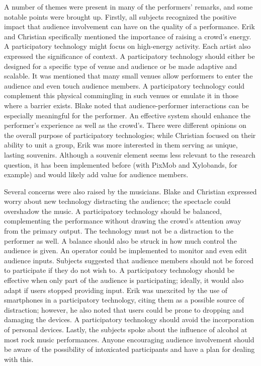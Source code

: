 A number of themes were present in many of the performers' remarks, and some notable points were brought up. Firstly, all subjects recognized the positive impact that audience involvement can have on the quality of a performance. Erik and Christian specifically mentioned the importance of raising a crowd's energy. A participatory technology might focus on high-energy activity. Each artist also expressed the significance of context. A participatory technology should either be designed for a specific type of venue and audience or be made adaptive and scalable. It was mentioned that many small venues allow performers to enter the audience and even touch audience members. A participatory technology could complement this physical commingling in such venues or emulate it in those where a barrier exists. Blake noted that audience-performer interactions can be especially meaningful for the performer. An effective system should enhance the performer's experience as well as the crowd's. There were different opinions on the overall purpose of participatory technologies; while Christian focused on their ability to unit a group, Erik was more interested in them serving as unique, lasting souvenirs.  Although a souvenir element seems less relevant to the research question, it has been implemented before (with PixMob and Xylobands, for example) and would likely add value for audience members. 

Several concerns were also raised by the musicians. Blake and Christian expressed worry about new technology distracting the audience; the spectacle could overshadow the music. A participatory technology should be balanced, complementing the performance without drawing the crowd's attention away from the primary output. The technology must not be a distraction to the performer as well. A balance should also be struck in how much control the audience is given. An operator could be implemented to monitor and even edit audience inputs. Subjects suggested that audience members should not be forced to participate if they do not wish to. A participatory technology should be effective when only part of the audience is participating; ideally, it would also adapt if users stopped providing input. Erik was unexcited by the use of smartphones in a participatory technology, citing them as a possible source of distraction; however, he also noted that users could be prone to dropping and damaging the devices. A participatory technology should avoid the incorporation of personal devices. Lastly, the subjects spoke about the influence of alcohol at most rock music performances. Anyone encouraging audience involvement should be aware of the possibility of intoxicated participants and have a plan for dealing with this.

